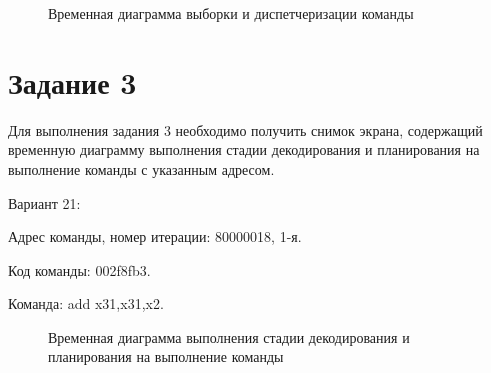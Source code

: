 \begin{figure}[ph!]
    \caption{Временная диаграмма выборки и диспетчеризации команды}
\end{figure}

\clearpage

\section{Задание 3}
Для выполнения задания 3 необходимо получить снимок экрана,
содер\-жащий временную диаграмму выполнения стадии декодирования
и плани\-рования на выполнение команды с указанным адресом.

Вариант 21:

\hspace{1cm} Адрес команды, номер итерации: 80000018, 1-я.
 
\hspace{1cm} Код команды: 002f8fb3.
 
\hspace{1cm} Команда: add x31,x31,x2.

\begin{figure}[ph!]
    \caption{Временная диаграмма выполнения стадии декодирования и планирования на выполнение команды}
    \label{fig:task3}
\end{figure}

